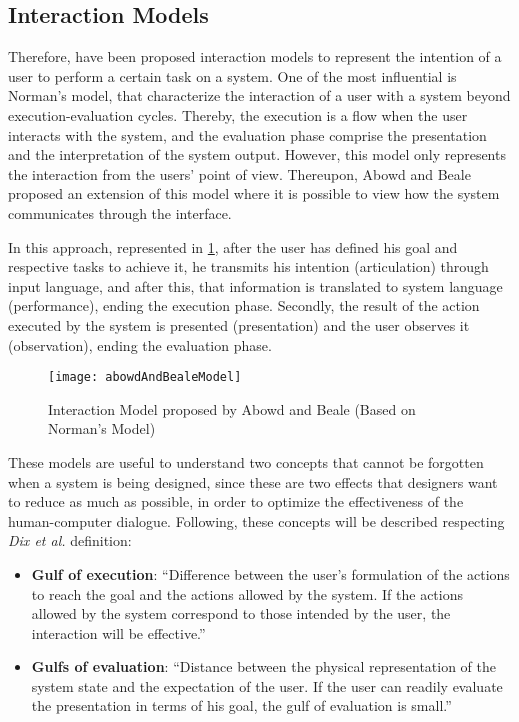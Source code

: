 \subsection{Interaction Models}
\label{subsec:interaction_models}

Therefore, have been proposed interaction models to represent the intention of a user to perform a certain task on a system. One of the most influential is Norman’s model, that characterize the interaction of a user with a system beyond execution-evaluation cycles. \cite{humanComputerInteraction} Thereby, the execution is a flow when the user interacts with the system, and the evaluation phase comprise the presentation and the interpretation of the system output. However, this model only represents the interaction from the users’ point of view. Thereupon, Abowd and Beale \cite{userSystemsAndInterfaces_aUnifyingFrameworkForInteraction} proposed an extension of this model where it is possible to view how the system communicates through the interface.

In this approach, represented in \ref{fig:abowdAndBealeModel}, after the user has defined his goal and respective tasks to achieve it, he transmits his intention (articulation) through input language, and after this, that information is translated to system language (performance), ending the execution phase. Secondly, the result of the action executed by the system is presented (presentation) and the user observes it (observation), ending the evaluation phase.

\begin{figure}[htbp]
	\centering
	\texttt{[image: abowdAndBealeModel]}
	\caption{Interaction Model proposed by Abowd and Beale \cite{userInterfacesForAll_newPerspectivesIntoHumanComputerInteraction} (Based on Norman’s Model)}
	\label{fig:abowdAndBealeModel}
\end{figure}

These models are useful to understand two concepts that cannot be forgotten when a system is being designed, since these are two effects that designers want to reduce as much as possible, in order to optimize the effectiveness of the human-computer dialogue. Following, these concepts will be described respecting \textit{Dix et al.} \cite{humanComputerInteraction} definition:

\begin{itemize}
    \item \textbf{Gulf of execution}: “Difference between the user’s formulation of the actions to reach the goal and the actions allowed by the system. If the actions allowed by the system correspond to those intended by the user, the interaction will be effective.”
    \item \textbf{Gulfs of evaluation}: “Distance between the physical representation of the system state and the expectation of the user. If the user can readily evaluate the presentation in terms of his goal, the gulf of evaluation is small.”
\end{itemize}


